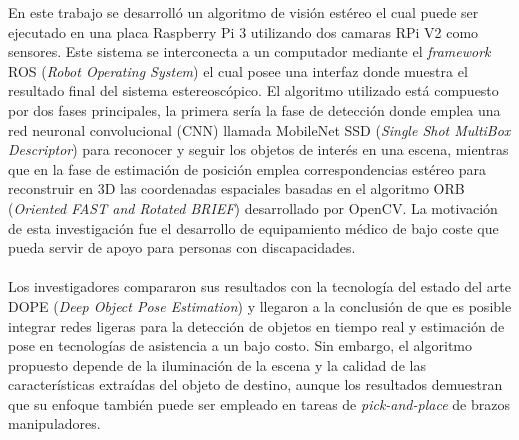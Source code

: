 En este trabajo se desarrolló un algoritmo de visión estéreo el cual puede ser ejecutado en una placa Raspberry Pi 3 utilizando dos camaras RPi V2 como sensores. Este sistema se interconecta a un computador mediante el \textit{framework} ROS (\textit{Robot Operating System}) el cual posee una interfaz donde muestra el resultado final del sistema estereoscópico. El algoritmo utilizado está compuesto por dos fases principales, la primera sería la fase de detección donde emplea una red neuronal convolucional (CNN) llamada MobileNet SSD (\textit{Single Shot MultiBox Descriptor}) para reconocer y seguir los objetos de interés en una escena, mientras que en la fase de estimación de posición emplea correspondencias estéreo para reconstruir en 3D las coordenadas espaciales basadas en el algoritmo ORB (\textit{Oriented FAST and Rotated BRIEF}) desarrollado por OpenCV. La motivación de esta investigación fue el desarrollo de equipamiento médico de bajo coste que pueda servir de apoyo para personas con discapacidades.
\\
\\
Los investigadores compararon sus resultados con la tecnología del estado del arte DOPE (\textit{Deep Object Pose Estimation}) y llegaron a la conclusión de que es posible integrar redes ligeras para la detección de objetos en tiempo real y estimación de pose en tecnologías de asistencia a un bajo costo. Sin embargo, el algoritmo propuesto depende de la iluminación de la escena y la calidad de las características extraídas del objeto de destino, aunque los resultados demuestran que su enfoque también puede ser empleado en tareas de \textit{pick-and-place} de brazos manipuladores.

